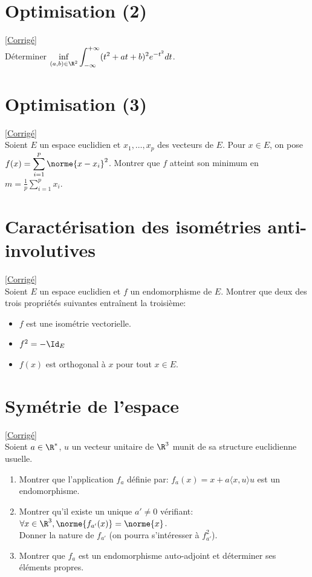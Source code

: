 \documentclass[8pt]{book}
\begin{document}
\section{Optimisation (2) }
\label{Optimisation 2}
\textcolor{blue}{\hyperref[Optimisation 2 corrigé]{[Corrigé]}}\\
Déterminer $\displaystyle\inf_{(a,b)\in \R^2}\int_{-\infty}^{+\infty}(t^2+at+b)^2e^{-t^2}dt$.

\section{Optimisation (3)}
\label{Optimisation 3}
\textcolor{blue}{\hyperref[Optimisation 3 corrigé]{[Corrigé]}}\\
Soient $E$ un espace euclidien et $x_1,\dots,x_p$ des vecteurs de $E$. Pour $x\in E$, on pose $f(x)=\displaystyle\sum\limits_{i=1}^p\norme{x-x_i}^2$. Montrer que $f$ atteint son minimum en $m=\displaystyle\frac{1}{p}\sum\limits_{i=1}^px_i$.

\section{Caractérisation des isométries anti-involutives }
\label{Caractérisation des isométries anti-involutives}
\textcolor{blue}{\hyperref[Caractérisation des isométries anti-involutives corrigé]{[Corrigé]}}\\
Soient $E$ un espace euclidien et $f$ un endomorphisme de $E$. Montrer que deux des trois propriétés suivantes entraînent la troisième:
\begin{itemize}
	\item $f$ est une isométrie vectorielle.
	\item $f^2=-\Id_E$
	\item $f(x)$ est orthogonal à $x$ pour tout $x\in E$.
\end{itemize}

\section{Symétrie de l'espace }
\label{Symétrie de l'espace}
\textcolor{blue}{\hyperref[Symétrie de l'espace corrigé]{[Corrigé]}}\\
Soient $a\in\R^*$, $u$ un vecteur unitaire de $\R^3$ munit de sa structure euclidienne usuelle.
\begin{enumerate}
	\item Montrer que l'application $f_a$ définie par: $f_a(x)=x+a\langle x,u\rangle u$ est un endomorphisme.
	\item Montrer qu'il existe un unique $a'\ne 0$ vérifiant: $\forall x\in\R^3, \norme{f_{a'}(x)}=\norme{x}$.\\ Donner la nature de $f_{a'}$ (on pourra s'intéresser à $f_{a'}^2$).
	\item Montrer que $f_a$ est un endomorphisme auto-adjoint et déterminer ses éléments propres.
\end{enumerate}
\end{document}
